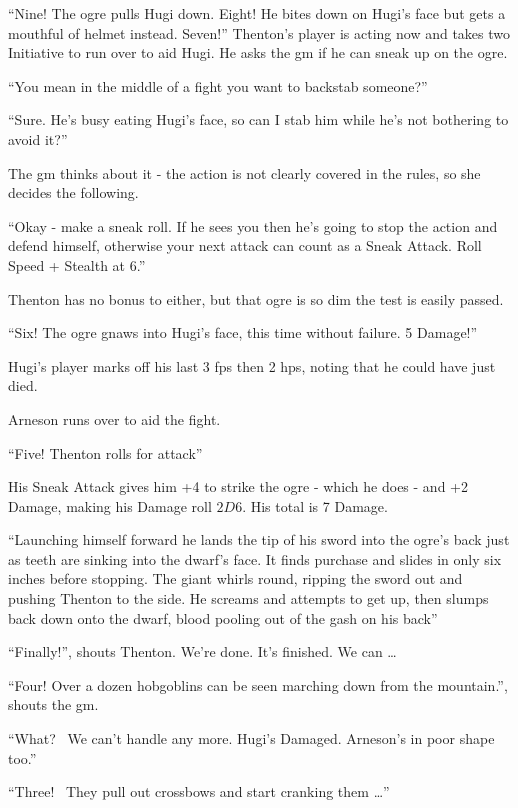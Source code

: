\begin{multicols}{2}
{\begin{exampletext}
		``Nine! The ogre pulls Hugi down. Eight! He bites down on Hugi's face but gets a mouthful of helmet instead. Seven!''
		Thenton's player is acting now and takes two Initiative to run over to aid Hugi. He asks the \gls{gm} if he can sneak up on the ogre.

		``You mean in the middle of a fight you want to backstab someone?''

		``Sure. He's busy eating Hugi's face, so can I stab him while he's not bothering to avoid it?''

		The \gls{gm} thinks about it - the action is not clearly covered in the rules, so she decides the following.

		``Okay - make a sneak roll.
		If he sees you then he's going to stop the action and defend himself, otherwise your next attack can count as a Sneak Attack. Roll Speed + Stealth at  6.''

		Thenton has no bonus to either, but that ogre is so dim the test is easily passed. 

		``Six! The ogre gnaws into Hugi's face, this time without failure. 5 Damage!''

		Hugi's player marks off his last 3 \glspl{fp} then 2 \glspl{hp}, noting that he could have just died.

		Arneson runs over to aid the fight.

``Five! Thenton rolls for attack''

His Sneak Attack gives him +4 to strike the ogre - which he does - and +2 Damage, making his Damage roll $2D6$. His total is 7 Damage.

		``Launching himself forward he lands the tip of his sword into the ogre's back just as teeth are sinking into the dwarf's face. It finds purchase and slides in only six inches before stopping. The giant whirls \gls{round}, ripping the sword out and pushing Thenton to the side. He screams and attempts to get up, then slumps back down onto the dwarf, blood pooling out of the gash on his back''

``Finally!'', shouts Thenton. We're done. It's finished. We can {\dots}

``Four! Over a dozen hobgoblins can be seen marching down from the mountain.'', shouts the \gls{gm}.

``What? \ We can't handle any more. Hugi's Damaged. Arneson's in poor shape too.''

``Three! \ They pull out crossbows and start cranking them {\dots}''
	\end{exampletext}}{}

\end{multicols}

